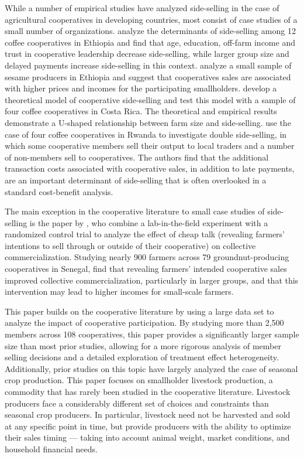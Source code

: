 \documentclass[11pt]{article}
\begin{document}
While a number of empirical studies have analyzed side-selling in the case of agricultural cooperatives in developing countries, most consist of case studies of a small number of organizations. \citet{shumeta_two-step_2018} analyze the determinants of side-selling among 12 coffee cooperatives in Ethiopia and find that age, education, off-farm income and trust in cooperative leadership decrease side-selling, while larger group size and delayed payments increase side-selling in this context. \citet{getnet_power_2018} analyze a small sample of sesame producers in Ethiopia and suggest that cooperatives sales are associated with higher prices and incomes for the participating smallholders.  \citet{wollni_member_2015} develop a theoretical model of cooperative side-selling and test this model with a sample of four coffee cooperatives in Costa Rica. The theoretical and empirical results demonstrate a U-shaped relationship between farm size and side-selling. \citet{mujawamariya_exploring_2013} use the case of four coffee cooperatives in Rwanda to investigate double side-selling, in which some cooperative members sell their output to local traders and a number of non-members sell to cooperatives. The authors find that the additional transaction costs associated with cooperative sales, in addition to late payments, are an important determinant of side-selling that is often overlooked in a standard cost-benefit analysis.

The main exception in the cooperative literature to small case studies of side-selling is the paper by \citet{aflagah_cheap_2019}, who combine a lab-in-the-field experiment with a randomized control trial to analyze the effect of cheap talk (revealing farmers' intentions to sell through or outside of their cooperative) on collective commercialization. Studying nearly 900 farmers across 79 groundnut-producing cooperatives in Senegal, \citet{aflagah_cheap_2019} find that revealing farmers' intended cooperative sales improved collective commercialization, particularly in larger groups, and that this intervention may lead to higher incomes for small-scale farmers. 

This paper builds on the cooperative literature by using a large data set to analyze the impact of cooperative participation. By studying more than 2,500 members across 108 cooperatives, this paper provides a significantly larger sample size than most prior studies, allowing for a more rigorous analysis of member selling decisions and a detailed exploration of treatment effect heterogeneity. Additionally, prior studies on this topic have largely analyzed the case of seasonal crop production. This paper focuses on smallholder livestock production, a commodity that has rarely been studied in the cooperative literature. Livestock producers face a considerably different set of choices and constraints than seasonal crop producers. In particular, livestock need not be harvested and sold at any specific point in time, but provide producers with the ability to optimize their sales timing --- taking into account animal weight, market conditions, and household financial needs.
\end{document}

